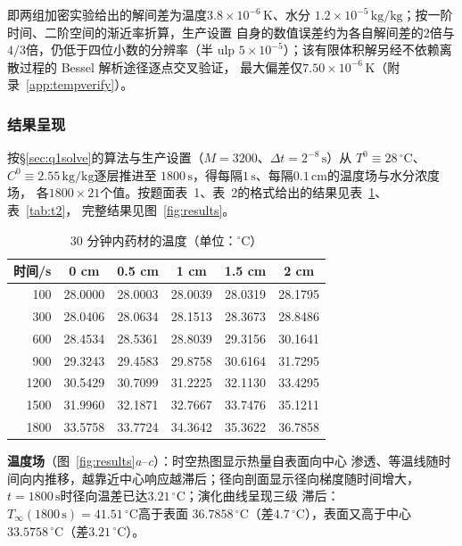 \documentclass[withoutpreface,bwprint]{cumcmthesis} %
\begin{document}
即两组加密实验给出的解间差为温度$3.8\times10^{-6}\,\mathrm{K}$、水分
$1.2\times10^{-5}\,\mathrm{kg/kg}$；按一阶时间、二阶空间的渐近率折算，生产设置
自身的数值误差约为各自解间差的$2$倍与$4/3$倍，仍低于四位小数的分辨率（半 ulp
$5\times10^{-5}$）；该有限体积解另经不依赖离散过程的 Bessel 解析途径逐点交叉验证，
最大偏差仅$7.50\times10^{-6}\,\mathrm{K}$（附录~\ref{app:tempverify}）。

\subsubsection{结果呈现}
\label{sec:q1results}

按\S\ref{sec:q1solve}的算法与生产设置（$M=3200$、$\Delta t=2^{-8}\,\mathrm{s}$）从
$T^0\equiv28\,^\circ\mathrm{C}$、$C^0\equiv2.55\,\mathrm{kg/kg}$逐层推进至
$1800\,\mathrm{s}$，得每隔$1\,\mathrm{s}$、每隔$0.1\,\mathrm{cm}$的温度场与水分浓度场，
各$1800\times21$个值。按题面表~1、表~2的格式给出的结果见表~\ref{tab:t1}、表~\ref{tab:t2}，
完整结果见图~\ref{fig:results}。

\begin{table}[htbp]
    \centering
    \caption{30 分钟内药材的温度（单位：$^\circ$C）}
    \label{tab:t1}
    \renewcommand{\arraystretch}{1.38}%
    \begin{tabular*}{\textwidth}{@{\extracolsep{\fill}}rccccc@{}}
    \toprule
    时间/s & 0 cm & 0.5 cm & 1 cm & 1.5 cm & 2 cm \\
    \midrule
    100 & 28.0000 & 28.0003 & 28.0039 & 28.0319 & 28.1795 \\
    300 & 28.0406 & 28.0634 & 28.1513 & 28.3673 & 28.8486 \\
    600 & 28.4534 & 28.5361 & 28.8039 & 29.3156 & 30.1641 \\
    900 & 29.3243 & 29.4583 & 29.8758 & 30.6164 & 31.7295 \\
    1200 & 30.5429 & 30.7099 & 31.2225 & 32.1130 & 33.4295 \\
    1500 & 31.9960 & 32.1871 & 32.7667 & 33.7476 & 35.1211 \\
    1800 & 33.5758 & 33.7724 & 34.3642 & 35.3622 & 36.7858 \\
    \bottomrule
    \end{tabular*}
\end{table}

\textbf{温度场}（图~\ref{fig:results}\emph{a}--\emph{c}）：时空热图显示热量自表面向中心
渗透、等温线随时间向内推移，越靠近中心响应越滞后；径向剖面显示径向梯度随时间增大，
$t=1800\,\mathrm{s}$时径向温差已达$\mathbf{3.21}\,^\circ\mathrm{C}$；演化曲线呈现三级
滞后：$T_\infty(1800\,\mathrm{s})=41.51\,^\circ\mathrm{C}$高于表面
$\mathbf{36.7858}\,^\circ\mathrm{C}$（差$4.7\,^\circ\mathrm{C}$），表面又高于中心
$\mathbf{33.5758}\,^\circ\mathrm{C}$（差$\mathbf{3.21}\,^\circ\mathrm{C}$）。
\end{document}
